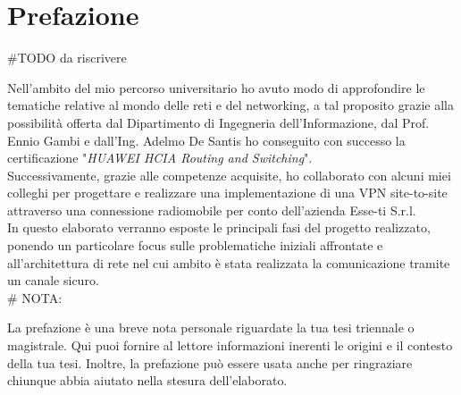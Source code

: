 \clearpage
\phantom{a}
\vfill


\chapter{Prefazione}


\begin{flushleft}

\#TODO da riscrivere 

Nell'ambito del mio percorso universitario ho avuto modo di approfondire le tematiche relative al mondo delle reti e del networking, a tal proposito grazie alla possibilità offerta dal Dipartimento di Ingegneria dell'Informazione, dal Prof. Ennio Gambi e dall'Ing. Adelmo De Santis ho conseguito con successo la certificazione "\textit{HUAWEI HCIA Routing and Switching}".\\
Successivamente, grazie alle competenze acquisite, ho collaborato con alcuni miei colleghi
per progettare e realizzare una implementazione di una VPN site-to-site attraverso una connessione radiomobile per conto dell'azienda Esse-ti S.r.l.\\
In questo elaborato verranno esposte le principali fasi del
progetto realizzato, ponendo un particolare focus sulle problematiche iniziali affrontate e all'architettura di rete nel cui ambito è stata realizzata la comunicazione tramite un canale sicuro.
\\
\# NOTA:

La prefazione è una breve nota personale riguardate la tua tesi triennale o magistrale. Qui puoi fornire al lettore informazioni inerenti le origini e il contesto della tua tesi.
Inoltre, la prefazione può essere usata anche per ringraziare chiunque abbia aiutato nella stesura dell’elaborato.
    

\end{flushleft}



\vfill
\newpage